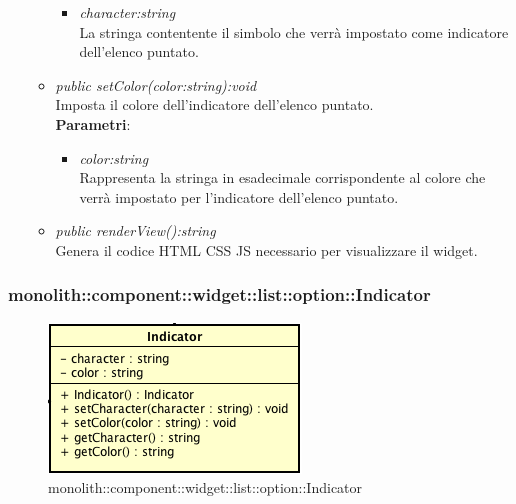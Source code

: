 \begin{itemize}
\begin{itemize}
\begin{itemize}
		\item \textit{character:string}\\
		La stringa contentente il simbolo che verrà impostato come indicatore dell'elenco puntato.
		\end{itemize} 
	\item \textit{public setColor(color:string):void}\\
	Imposta il colore dell'indicatore dell'elenco puntato.
		\\ \textbf{Parametri}: \begin{itemize}
		\item \textit{color:string}\\
		Rappresenta la stringa in esadecimale corrispondente al colore che verrà impostato per l'indicatore dell'elenco puntato.
		\end{itemize} 
	\item \textit{public renderView():string}\\
	Genera il codice HTML CSS JS necessario per visualizzare il widget.
	\end{itemize}
\end{itemize}

\subsubsection{monolith::component::widget::list::option::Indicator}

\label{monolith::component::widget::list::option::Indicator}
\begin{figure}[H]
	\centering
	\includegraphics[scale=0.5]{Sezioni/SottosezioniST/img/Indicator.png}
	\caption{monolith::component::widget::list::option::Indicator}
\end{figure}

